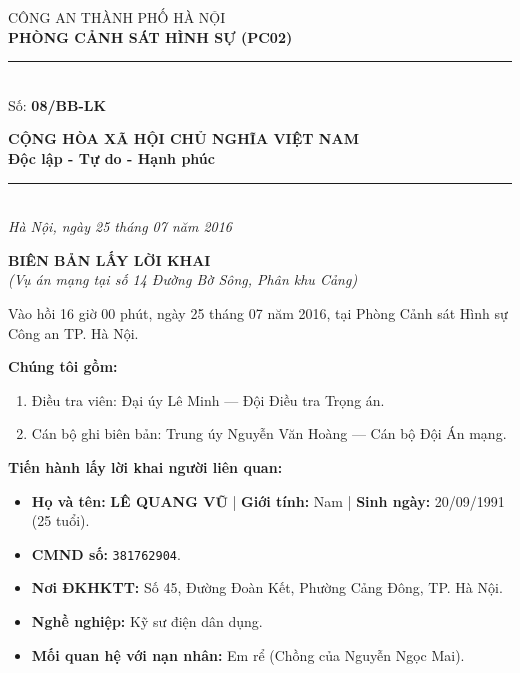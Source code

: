 \documentclass[12pt,a4paper]{article}
\begin{document}
\noindent
\begin{minipage}[t]{0.46\textwidth}
    \begin{center}
        \fontsize{11pt}{13pt}\selectfont
        CÔNG AN THÀNH PHỐ HÀ NỘI\\
        \textbf{PHÒNG CẢNH SÁT HÌNH SỰ (PC02)}\\[-0.2em]
        \rule{3.2cm}{0.6pt}\\[0.25cm]
        \fontsize{11pt}{13pt}\selectfont Số: \textbf{08/BB-LK}
    \end{center}
\end{minipage}
\hfill
\begin{minipage}[t]{0.52\textwidth}
    \begin{center}
        \fontsize{11pt}{13pt}\selectfont
        \textbf{CỘNG HÒA XÃ HỘI CHỦ NGHĨA VIỆT NAM}\\
        \textbf{Độc lập - Tự do - Hạnh phúc}\\[-0.2em]
        \rule{3.6cm}{0.6pt}\\[0.25cm]
        \textit{Hà Nội, ngày 25 tháng 07 năm 2016}
    \end{center}
\end{minipage}

\vspace{0.5cm}

\begin{center}
    \textbf{\Large BIÊN BẢN LẤY LỜI KHAI}\\[0.15cm]
    \textit{(Vụ án mạng tại số 14 Đường Bờ Sông, Phân khu Cảng)}
\end{center}

\vspace{0.3cm}


Vào hồi 16 giờ 00 phút, ngày 25 tháng 07 năm 2016, tại Phòng Cảnh sát Hình sự Công an TP. Hà Nội.

\textbf{Chúng tôi gồm:}

\begin{enumerate}[label=\arabic*., leftmargin=*, itemsep=2pt, topsep=2pt, parsep=0pt]
  \item Điều tra viên: Đại úy Lê Minh — Đội Điều tra Trọng án.
  \item Cán bộ ghi biên bản: Trung úy Nguyễn Văn Hoàng — Cán bộ Đội Án mạng.

\end{enumerate}
\textbf{Tiến hành lấy lời khai người liên quan:}

\begin{itemize}[leftmargin=*, itemsep=2pt, topsep=2pt, parsep=0pt]
  \item \textbf{Họ và tên:} \textbf{LÊ QUANG VŨ} | \textbf{Giới tính:} Nam | \textbf{Sinh ngày:} 20/09/1991 (25 tuổi).
  \item \textbf{CMND số:} \texttt{381762904}.
  \item \textbf{Nơi ĐKHKTT:} Số 45, Đường Đoàn Kết, Phường Cảng Đông, TP. Hà Nội.
  \item \textbf{Nghề nghiệp:} Kỹ sư điện dân dụng.
  \item \textbf{Mối quan hệ với nạn nhân:} Em rể (Chồng của Nguyễn Ngọc Mai).


\end{itemize}
\end{document}
